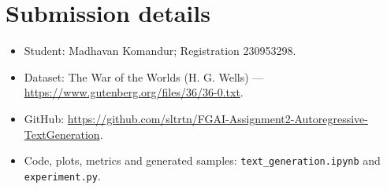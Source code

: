 \documentclass[11pt]{article}
\begin{document}
\section{Submission details}
\begin{itemize}
\item Student: Madhavan Komandur; Registration 230953298.
\item Dataset: The War of the Worlds (H. G. Wells) --- \url{https://www.gutenberg.org/files/36/36-0.txt}.
\item GitHub: \url{https://github.com/sltrtn/FGAI-Assignment2-Autoregressive-TextGeneration}.
\item Code, plots, metrics and generated samples: \texttt{text\_generation.ipynb} and \texttt{experiment.py}.
\end{itemize}
\end{document}

